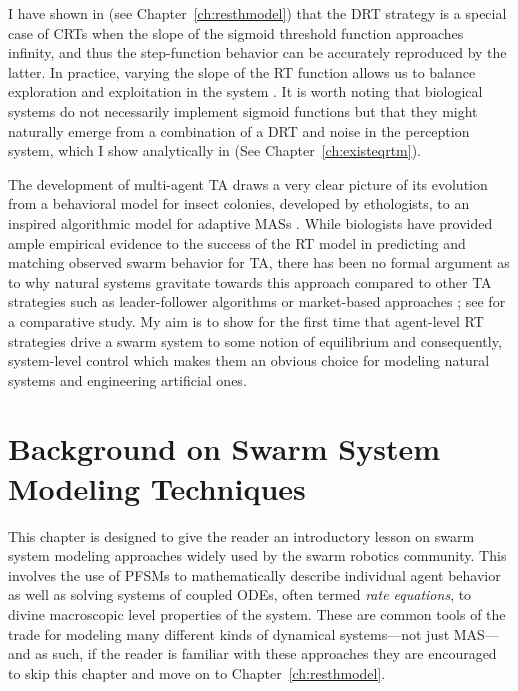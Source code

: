 \documentclass[defaultstyle,12pt]{proposal}
\begin{document}
I have shown in \cite{Kanakia2014} (see Chapter~\ref{ch:resthmodel}) that the DRT strategy is a special case of CRTs when the slope of the sigmoid threshold function approaches infinity, and thus the step-function behavior can be accurately reproduced by the latter. In practice, varying the slope of the RT function allows us to balance exploration and exploitation in the system \cite{Bonabeau1997}. It is worth noting that biological systems do not necessarily implement sigmoid functions but that they might naturally emerge from a combination of a DRT and noise in the perception system, which I show analytically in \cite{Kanakia2015} (See Chapter~\ref{ch:existeqrtm}). 

The development of multi-agent TA draws a very clear picture of its evolution from a behavioral model for insect colonies, developed by ethologists, to an inspired algorithmic model for adaptive MASs \cite{Krieger2000}. While biologists have provided ample empirical evidence to the success of the RT model in predicting and matching observed swarm behavior for TA, there has been no formal argument as to why natural systems gravitate towards this approach compared to other TA strategies such as leader-follower algorithms \cite{Chen2011} or market-based approaches \cite{Amstutz2008,Vig2007}; see \cite{Kalra2006} for a comparative study. My aim is to show for the first time that agent-level RT strategies drive a swarm system to some notion of equilibrium and consequently, system-level control which makes them an obvious choice for modeling natural systems and engineering artificial ones.



\chapter{Background on Swarm System Modeling Techniques}\label{ch:background}
This chapter is designed to give the reader an introductory lesson on swarm system modeling approaches widely used by the swarm robotics community. This involves the use of PFSMs to mathematically describe individual agent behavior as well as solving systems of coupled ODEs, often termed \emph{rate equations}, to divine macroscopic level properties of the system. These are common tools of the trade for modeling many different kinds of dynamical systems---not just MAS---and as such, if the reader is familiar with these approaches they are encouraged to skip this chapter and move on to Chapter~\ref{ch:resthmodel}.
\end{document}
